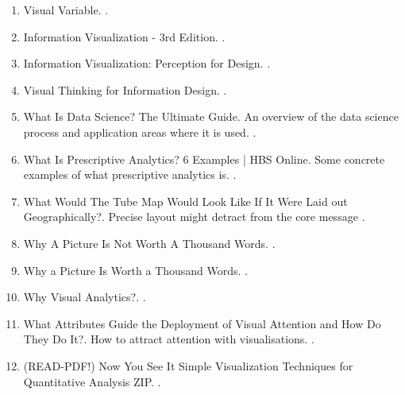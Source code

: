 \documentclass[a4paper]{article}
\begin{document}
\begin{enumerate}
\item Visual Variable.  \parencite{VisualVariable2022}.
\item Information Visualization - 3rd Edition.  \parencite{wareInformationVisualization3rd2013}.
\item Information Visualization: Perception for Design.  \parencite{wareInformationVisualizationPerception2004}.
\item Visual Thinking for Information Design.  \parencite{wareVisualThinkingInformation2021}.
\item What Is Data Science? The Ultimate Guide. An overview of the data science process and application areas where it is used. \parencite{WhatDataScience}.
\item What Is Prescriptive Analytics? 6 Examples | HBS Online. Some concrete examples of what prescriptive analytics is. \parencite{WhatPrescriptiveAnalytics2021}.
\item What Would The Tube Map Would Look Like If It Were Laid out Geographically?. Precise layout might detract from the core message \parencite{WhatWouldTube2011}.
\item Why A Picture Is Not Worth A Thousand Words.  \parencite{WhyPictureNot2016}.
\item Why a Picture Is Worth a Thousand Words.  \parencite{WhyPictureWorth2011}.
\item Why Visual Analytics?.  \parencite{WhyVisualAnalytics}.
\item What Attributes Guide the Deployment of Visual Attention and How Do They Do It?. How to attract attention with visualisations. \parencite{wolfeWhatAttributesGuide2004}.
\item (READ-PDF!) Now You See It Simple Visualization Techniques for Quantitative Analysis ZIP.  \parencite{yumpu.comREADPDFNowYou}.


\end{enumerate}

\printbibliography
\end{document}

